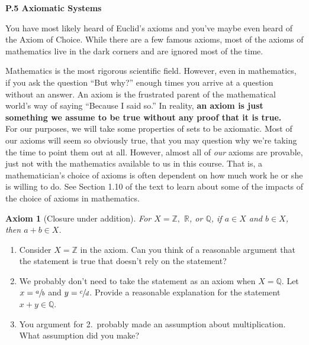 \documentclass[12 pt]{article}
\newcommand{\R}{\mathbb{R}}
\newcommand{\Z}{\mathbb{Z}}
\newcommand{\Q}{\mathbb{Q}}
\theoremstyle{definition}
\theoremstyle{plain}
\theoremstyle{mytheorem}
\theoremstyle{myexample}
\theoremstyle{mydefinition}
\newtheorem{axiom}{Axiom}[]
\begin{document}
\begin{center}
\textbf{P.5 Axiomatic Systems}
\end{center}

You have most likely heard of Euclid's axioms and you've maybe even heard of the Axiom of Choice.  While there are a few famous axioms, most of the axioms of mathematics live in the dark corners and are ignored most of the time.
\begin{center}
\end{center}

Mathematics is the most rigorous scientific field.  However, even in mathematics, if you ask the question ``But why?'' enough times you arrive at a question without an answer.  An axiom is the frustrated parent of the mathematical world's way of saying ``Because I said so.''  In reality, \textbf{an axiom is just something we assume to be true without any proof that it is true.}\\

For our purposes, we will take some properties of sets to be axiomatic.  Most of our axioms will seem so obviously true, that you may question why we're taking the time to point them out at all.  However, almost all of \textit{our} axioms are provable, just not with the mathematics available to us in this course.  That is, a mathematician's choice of axioms is often dependent on how much work he or she is willing to do.  See Section 1.10 of the text to learn about some of the impacts of the choice of axioms in mathematics.


\begin{axiom}[Closure under addition] For $X = \Z,$ $\R$, or $\Q$, if $a \in X$ and $b \in X$, then $a+b \in X$.  
\end{axiom}
		\begin{enumerate}[label=\arabic*.]
		\item Consider $X = \Z$ in the axiom.  Can you think of a reasonable argument that the statement is true that doesn't rely on the statement?
		\vspace{1in}
		\item We probably don't need to take the statement as an axiom when $X=\Q$.  Let $x=\sfrac{a}{b}$ and $y=\sfrac{c}{d}$.  Provide a reasonable explanation for the statement $x+y \in \Q$.
		\vspace{1.5in}
		
		\item You argument for 2.~probably made an assumption about multiplication.  What assumption did you make?
		\vspace{.5in}
		\end{enumerate}
		
\end{document}
